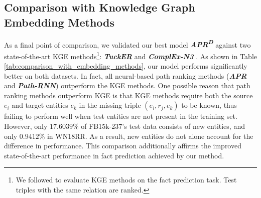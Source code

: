 \documentclass[letterpaper]{article} %
\begin{document}
\subsection{Comparison with Knowledge Graph Embedding Methods}
As a final point of comparison, we validated our best model \textit{\textbf{APR\textsuperscript{D}}} against two state-of-the-art KGE methods\footnote{We followed \cite{deeppath} to evaluate KGE methods on the fact prediction task. Test triples with the same relation are ranked.}: \textit{\textbf{TuckER}} \cite{tucker} and \textbf{\textit{ComplEx-N3}} \cite{complex}. As shown in Table \ref{tab:comparison_with_embedding_methods}, our model performs significantly better on both datasets. In fact, all neural-based path ranking methods (\textit{\textbf{APR}} and \textbf{\textit{Path-RNN}}) outperform the KGE methods. One possible reason that path ranking methods outperform KGE is that KGE methods require both the source $e_i$ and target entities $e_k$ in the missing triple $(e_i, r_j, e_k)$ to be known, thus failing to perform well when test entities are not present in the training set.  However, only $17.6039\%$ of FB15k-237's test data consists of new entities, and only $0.9412\%$ in WN18RR.  As a result, new entities do not alone account for the difference in performance.  This comparison additionally affirms the improved state-of-the-art performance in fact prediction achieved by our method. 


\end{document}
